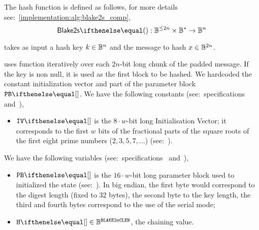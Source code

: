 The hash function is defined as follows, for more details see:~\cref{implementation:alg:blake2s_comp},
\[
  \blake{2s}{} : \BB^{\leq 2n} \times \BB^{*} \to \BB^n
\]

 takes as input a hash key $k \in \mathbb{B}^n$ and the message to hash $x \in \mathbb{B}^{2n}$.

 uses  function iteratively over each $2n$-bit long chunk of the padded message. If the key is non null, it is used as the first block to be hashed. We hardcoded the constant initialization vector \blakeIV{} and part of the parameter block $\blakePB{}$. We have the following constants (see:~specifications~\cite{aumasson2013blake2} and~\cite[Section 2.2]{blakecompietf}),
\begin{itemize}
    \item $\blakeIV{}$ is the $8 \cdot w$-bit long Initialisation Vector; it corresponds to the first $w$ bits of the fractional parts of the square roots of the first eight prime numbers ($2, 3, 5, 7, \ldots$) (see:~\cite[Section 2.6]{blakecompietf}).
\end{itemize}
  We have the following variables (see:~specifications~\cite{aumasson2013blake2} and~\cite[Section 2.2]{blakecompietf}),
  \begin{itemize}
    \item $\blakePB{}$ is the $16 \cdot w$-bit long parameter block used to initialized the state (see:~\cite[Section 2.5]{blakecompietf}). In big endian, the first byte would correspond to the digest length (fixed to 32 bytes), the second byte to the key length, the third and fourth bytes correspond to the use of the serial mode;
    \item $\blakeInitState{} \in \BB^\blakeCompLen$, the chaining value.
\end{itemize}

